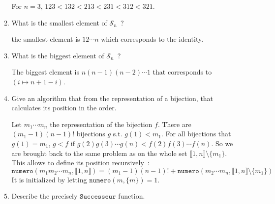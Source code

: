 \documentclass[a4paper,11pt]{exam}
\renewcommand{\S}{\mathcal{S}}
\begin{document}
\begin{questions}
\begin{enumerate}
\begin{enumerate}
\begin{solution}
           For $n = 3$, $123 < 132 < 213 < 231 < 312 < 321$.
          \end{solution}

        \item What is the smallest element of $\S_n$~?

          \begin{solution}
            the smallest element is $1 2 \cdots n$ which corresponds to the identity.
          \end{solution}

        \item What is the biggest element of $\S_n$~?

          \begin{solution}
            The biggest element is $n(n-1)(n-2) \cdots 1$ that corresponds to
            $(i \mapsto n+1-i)$.
          \end{solution}

        \item Give an algorithm that from the representation of a bijection, that calculates its position in the order.

          \begin{solution}
            Let $m_1 \cdots m_n$ the representation of the bijection $f$.
            There are $(m_1-1)(n-1)!$ bijections $g$ s.t. $g(1) < m_1$.
            For all bijections that $g(1)=m_1$, $g < f$ if
            $g(2) g(3) \cdots g(n) < f(2) f(3) \cdots f(n)$.
            So we are brought back to the same problem as on the whole set
            $\llbracket 1,n \rrbracket \setminus \{m_1\}$.
            This allows to define its position recursively~:
            \[
              \texttt{numero}(m_1 m_2 \cdots m_n, \llbracket 1,n \rrbracket) = 
              (m_1-1)(n-1)! + \texttt{numero}(m_2 \cdots m_n,
              \llbracket 1,n \rrbracket \setminus \{m_1\})
            \]
            It is initialized by letting $\texttt{numero}(m,\{m\})=1$.
          \end{solution}

        \item Describe the precisely $\texttt{Successeur}$ function.


\end{enumerate}
\end{enumerate}
\end{questions}
\end{document}
